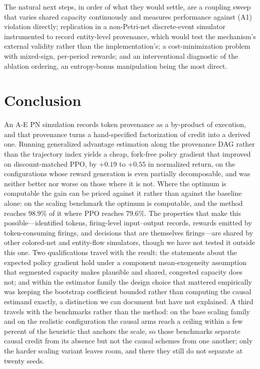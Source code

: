 \documentclass[review,authoryear,3p,times]{elsarticle}
\begin{document}
The natural next steps, in order of what they would settle, are a coupling sweep
that varies shared capacity continuously and measures performance against (A1)
violation directly; replication in a non-Petri-net discrete-event simulator
instrumented to record entity-level provenance, which would test the mechanism's
external validity rather than the implementation's; a cost-minimization problem
with mixed-sign, per-period rewards; and an interventional diagnostic of the
ablation ordering, an entropy-bonus manipulation being the most direct.

\section{Conclusion}

An A-E PN simulation records token provenance as a by-product of execution, and
that provenance turns a hand-specified factorization of credit into a derived
one. Running generalized advantage estimation along the provenance DAG rather
than the trajectory index yields a cheap, fork-free policy gradient that
improved on discount-matched PPO, by $+0.19$ to $+0.55$ in normalized return, on
the configurations whose reward generation is even partially decomposable, and
was neither better nor worse on those where it is not. Where the optimum is
computable the gain can be priced against it rather than against the baseline
alone: on the scaling benchmark the optimum is computable, and the method
reaches $98.9\%$ of it where PPO reaches $79.6\%$. The properties that make
this possible---identified tokens, firing-level input--output records, rewards
emitted by token-consuming firings, and decisions that are themselves
firings---are shared by other colored-net and entity-flow simulators, though we
have not tested it outside this one. Two qualifications travel with the result:
the statements about the expected policy gradient hold under a component
mean-exogeneity assumption that segmented capacity makes plausible and shared,
congested capacity does not; and within the estimator family the design choice
that mattered empirically was keeping the bootstrap coefficient bounded rather
than computing the causal estimand exactly, a distinction we can document but
have not explained. A third travels with the benchmarks rather than the method:
on the base scaling family and on the realistic configuration the causal arms
reach a ceiling within a few percent of the heuristic that anchors the scale,
so those benchmarks separate causal credit from its absence but not the causal
schemes from one another; only the harder scaling variant leaves room, and
there they still do not separate at twenty seeds.
\end{document}
